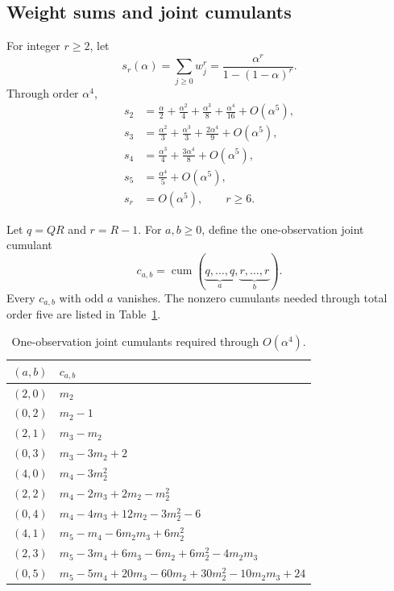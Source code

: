 \documentclass[11pt]{article}
\newcommand{\cum}{\operatorname{cum}}
\begin{document}
\subsection{Weight sums and joint cumulants}
For integer $r\ge2$, let
\begin{equation}
s_r(\alpha)=\sum_{j\ge0}w_j^r
=\frac{\alpha^r}{1-(1-\alpha)^r}.
\end{equation}
Through order $\alpha^4$,
\begin{align}
s_2&=\frac\alpha2+\frac{\alpha^2}{4}+\frac{\alpha^3}{8}+\frac{\alpha^4}{16}+O(\alpha^5),\\
s_3&=\frac{\alpha^2}{3}+\frac{\alpha^3}{3}+\frac{2\alpha^4}{9}+O(\alpha^5),\\
s_4&=\frac{\alpha^3}{4}+\frac{3\alpha^4}{8}+O(\alpha^5),\\
s_5&=\frac{\alpha^4}{5}+O(\alpha^5),\\
s_r&=O(\alpha^5),\qquad r\ge6.
\end{align}

Let $q=QR$ and $r=R-1$. For $a,b\ge0$, define the one-observation joint cumulant
\begin{equation}
c_{a,b}=\cum(\underbrace{q,\ldots,q}_{a},\underbrace{r,\ldots,r}_{b}).
\end{equation}
Every $c_{a,b}$ with odd $a$ vanishes. The nonzero cumulants needed through total order five are listed in Table~\ref{tab:cumulants}.

\begin{table}[htbp]
\centering
\caption{One-observation joint cumulants required through $O(\alpha^4)$.}
\label{tab:cumulants}
\small
\begin{tabular}{c p{}}
\toprule
$(a,b)$ & $c_{a,b}$ \\
\midrule
$(2,0)$ & $m_2$ \\
$(0,2)$ & $m_2-1$ \\
$(2,1)$ & $m_3-m_2$ \\
$(0,3)$ & $m_3-3m_2+2$ \\
$(4,0)$ & $m_4-3m_2^2$ \\
$(2,2)$ & $m_4-2m_3+2m_2-m_2^2$ \\
$(0,4)$ & $m_4-4m_3+12m_2-3m_2^2-6$ \\
$(4,1)$ & $m_5-m_4-6m_2m_3+6m_2^2$ \\
$(2,3)$ & $m_5-3m_4+6m_3-6m_2+6m_2^2-4m_2m_3$ \\
$(0,5)$ & $m_5-5m_4+20m_3-60m_2+30m_2^2-10m_2m_3+24$ \\
\bottomrule
\end{tabular}
\end{table}
\end{document}

